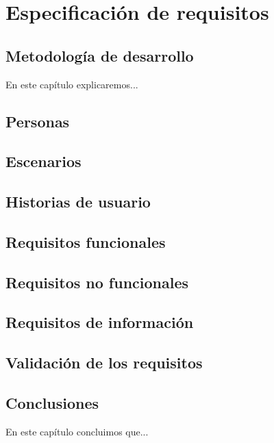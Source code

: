 \chapter{Especificación de requisitos}\label{cap:especificación}

\section{Metodología de desarrollo}
En este capítulo explicaremos...

\section{Personas}

\section{Escenarios}

\section{Historias de usuario}

\section{Requisitos funcionales}

\section{Requisitos no funcionales}

\section{Requisitos de información}

\section{Validación de los requisitos}

\section{Conclusiones}
En este capítulo concluimos que...